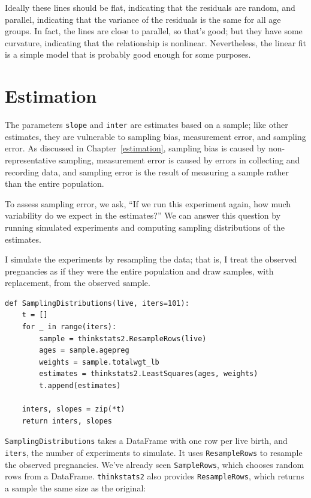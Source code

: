 \documentclass[12pt]{book}
\begin{document}
Ideally these lines should be flat, indicating that the residuals are
random, and parallel, indicating that the variance of the residuals is
the same for all age groups.  In fact, the lines are close to
parallel, so that's good; but they have some curvature, indicating
that the relationship is nonlinear.  Nevertheless, the linear fit
is a simple model that is probably good enough for some purposes.


\section{Estimation}
\label{regest}

The parameters {\tt slope} and {\tt inter} are estimates based on a
sample; like other estimates, they are vulnerable to sampling bias,
measurement error, and sampling error.  As discussed in
Chapter~\ref{estimation}, sampling bias is caused by non-representative
sampling, measurement error is caused by errors in collecting
and recording data, and sampling error is the result of measuring a
sample rather than the entire population.

To assess sampling error, we ask, ``If we run this experiment again,
how much variability do we expect in the estimates?''  We can
answer this question by running simulated experiments and computing
sampling distributions of the estimates.

I simulate the experiments by resampling the data; that is, I treat
the observed pregnancies as if they were the entire population
and draw samples, with replacement, from the observed sample.

\begin{verbatim}
def SamplingDistributions(live, iters=101):
    t = []
    for _ in range(iters):
        sample = thinkstats2.ResampleRows(live)
        ages = sample.agepreg
        weights = sample.totalwgt_lb
        estimates = thinkstats2.LeastSquares(ages, weights)
        t.append(estimates)

    inters, slopes = zip(*t)
    return inters, slopes
\end{verbatim}

{\tt SamplingDistributions} takes a DataFrame with one row per live
birth, and {\tt iters}, the number of experiments to simulate.  It
uses {\tt ResampleRows} to resample the observed pregnancies.  We've
already seen {\tt SampleRows}, which chooses random rows from a
DataFrame.  {\tt thinkstats2} also provides {\tt ResampleRows}, which
returns a sample the same size as the original:
\end{document}
